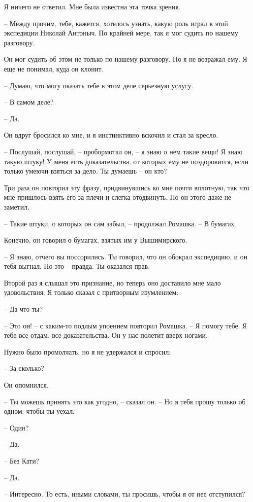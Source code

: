 \documentclass{bmstu}
\begin{document}
Я ничего не ответил. Мне была известна эта точка зрения.

– Между прочим, тебе, кажется, хотелось узнать, какую роль играл в этой
экспедиции Николай Антоныч. По крайней мере, так я мог судить по нашему
разговору.

Он мог судить об этом не только по нашему разговору. Но я не возражал ему. Я еще
не понимал, куда он клонит.

– Думаю, что могу оказать тебе в этом деле серьезную услугу.

– В самом деле?

– Да.

Он вдруг бросился ко мне, и я инстинктивно вскочил и стал за кресло.

– Послушай, послушай, – пробормотал он, – я знаю о нем такие вещи! Я знаю такую
штуку! У меня есть доказательства, от которых ему не поздоровится, если только
умеючи взяться за дело. Ты думаешь – он кто?

Три раза он повторил эту фразу, придвинувшись ко мне почти вплотную, так что мне
пришлось взять его за плечи и слегка отодвинуть. Но он этого даже не заметил.

– Такие штуки, о которых он сам забыл, – продолжал Ромашка. – В бумагах.

Конечно, он говорил о бумагах, взятых им у Вышимирского.

– Я знаю, отчего вы поссорились. Ты говорил, что он обокрал экспедицию, и он
тебя выгнал. Но это – правда. Ты оказался прав.

Второй раз я слышал это признание, но теперь оно доставило мне мало
удовольствия. Я только сказал с притворным изумлением:

– Да что ты?

– Это он! – с каким-то подлым упоением повторил Ромашка. – Я помогу тебе. Я тебе
все отдам, все доказательства. Он у нас полетит вверх ногами.

Нужно было промолчать, но я не удержался и спросил:

– За сколько?

Он опомнился.

– Ты можешь принять это как угодно, – сказал он. – Но я тебя прошу только об
одном: чтобы ты уехал.

– Один?

– Да.

– Без Кати?

– Да.

– Интересно. То есть, иными словами, ты просишь, чтобы я от нее отступился?
\end{document}
